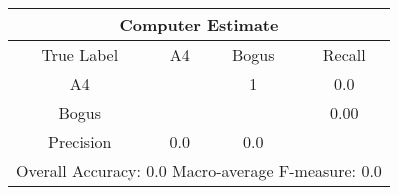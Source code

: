 \begin{tabular}{|c||c|c||c|}
\hline 
\multicolumn{4}{|c|}{Computer Estimate}\\
\hline 
True Label & A4 & Bogus & Recall \\
\hline 
A4 &  & 1 &  0.0\\
Bogus &  &  &  0.00\\
\hline 
Precision & 0.0 & 0.0 & \\
\hline 
\multicolumn{4}{|c|}{Overall Accuracy: 0.0 Macro-average F-measure: 0.0}\\
\hline 
\end{tabular} 
